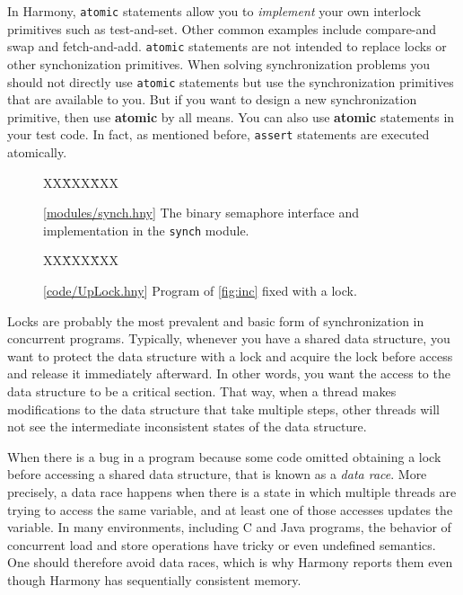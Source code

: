 \documentclass{report}
\newcommand{\harmonysource}[1]{
\begin{tabbing}
XX\=XXX\=XXX\kill
    
\end{tabbing}
}
\newcommand{\harmonylink}[1]{%
[\href{https://harmony.cs.cornell.edu/#1}{\underline{#1}}]%
}
\newenvironment{code}{
\tcolorbox
}{
\endtcolorbox
}
\begin{document}
In Harmony, \texttt{atomic} statements allow you to \emph{implement} your own
interlock primitives such as test-and-set.  Other common examples
include compare-and swap and fetch-and-add.  \texttt{atomic} statements
are not intended to replace locks or other synchonization primitives.
When solving synchronization problems you should not directly use
\texttt{atomic} statements but use the synchronization primitives that are available
to you.  But if you want to design a new synchronization primitive, then
use \textbf{atomic} by all means.
You can also use \textbf{atomic} statements in your test code.
In fact, as mentioned before, \texttt{assert} statements are executed atomically.

\begin{figure}
\begin{code}
\harmonysource{lockintf}
\end{code}
\caption{\harmonylink{modules/synch.hny} The binary semaphore interface and implementation in the \texttt{synch} module.}
\label{fig:spinlocks}
\end{figure}

\begin{figure}
\begin{code}
\harmonysource{UpLock}
\end{code}
\caption{\harmonylink{code/UpLock.hny} Program of \autoref{fig:inc} fixed with a lock.}
\label{fig:incfixed}
\end{figure}

Locks are probably the most prevalent and basic form of synchronization
in concurrent programs.  Typically, whenever you have a shared data
structure, you want to protect the data structure with a lock and
acquire the lock before access and release it immediately afterward.
In other words, you want the access to the data structure to be a
critical section.
That way, when a thread makes modifications to the data structure that take
multiple steps, other threads will not see the intermediate inconsistent
states of the data structure.

%
%
When there is a bug in a program because some code omitted obtaining
a lock before accessing a shared data structure, that is known as a
\emph{data race}.
More precisely, a data race happens when there is a state in which multiple
threads are trying to access the same variable, and at least one of those
accesses updates the variable.
In many environments, including C and Java programs, the behavior of
concurrent load and store operations have tricky or even undefined
semantics.  One should therefore avoid data races, which is why Harmony
reports them even though Harmony has sequentially consistent memory.
\end{document}

